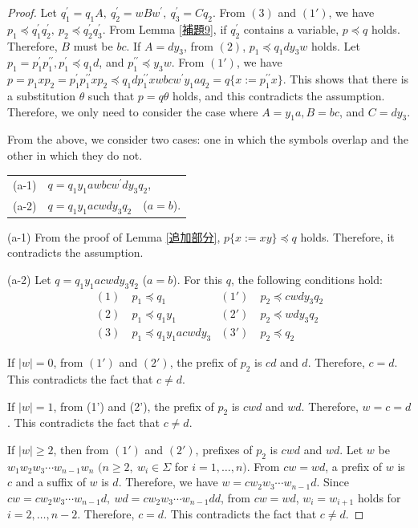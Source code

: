 \begin{proof}
Let $q^{\prime}_{1}=q_{1}A,~q^{\prime}_{2}=wBw^{\prime},~q^{\prime}_{3}=Cq_{2}$. From $(3)$ and $(1')$, we have $p_{1} \preceq q^{\prime}_{1}q^{\prime}_{2},~p_{2} \preceq q^{\prime}_{2}q^{\prime}_{3}$.
From Lemma \ref{補題9}, if $q^{\prime}_{2}$ contains a variable, $p \preceq q$ holds.
Therefore, $B$ must be $bc$.
If $A=dy_{3}$, from $(2)$, $p_{1} \preceq q_{1}dy_{3}w$ holds.
Let $p_{1}=p^{\prime}_{1}p^{\prime\prime}_{1}, p^{\prime}_{1} \preceq q_{1}d$, and $p^{\prime\prime}_{1} \preceq y_{3}w$.
From $(1')$, we have $p=p_{1}xp_{2}=p^{\prime}_{1}p^{\prime\prime}_{1}xp_{2} \preceq q_{1}dp^{\prime\prime}_{1}xwbcw^{\prime}y_{1}aq_{2}=q \{ x:=p^{\prime\prime}_{1}x \}$. This shows that there is a substitution $\theta$ such that $p=q\theta$ holds, and this contradicts the assumption. Therefore, we only need to consider the case where $A=y_{1}a,B=bc$, and $C=dy_{3}$.

From the above, we consider two cases: one in which the symbols overlap and the other in which they do not.
\smallskip

\begin{tabular}{cl}
\textrm{(a-1)} & $q=q_{1}y_{1}awbcw^{\prime}dy_{3}q_{2}$,\\
\textrm{(a-2)} & $q=q_{1}y_{1}acwdy_{3}q_{2}$~~($a=b$).
\end{tabular}
\smallskip

\textrm{(a-1)}
From the proof of Lemma \ref{追加部分}, $p \{ x:= xy \} \preceq q$ holds.
Therefore, it contradicts the assumption.

\textrm{(a-2)}
Let $q=q_{1}y_{1}acwdy_{3}q_{2}$ ($a=b$).
For this $q$, the following conditions hold:
\begin{align*}
(1)~& p_{1} \preceq q_{1} & (1')~& p_{2} \preceq cwdy_{3}q_{2} \\
(2)~& p_{1} \preceq q_{1}y_{1} & (2')~& p_{2} \preceq wdy_{3}q_{2} \\
(3)~& p_{1} \preceq q_{1}y_{1}acwdy_{3} & (3')~& p_{2} \preceq q_{2}
\end{align*}

%
If $|w|=0$, from $(1')$ and $(2')$, the prefix of $p_{2}$ is $cd$ and $d$.
Therefore, $c=d$. This contradicts the fact that $c \not = d$.

If $|w|=1$, from (1') and (2'), the prefix of $p_{2}$ is $cwd$ and $wd$.
Therefore, $w=c=d$.
This contradicts the fact that $c \not = d$.

If $|w| \ge 2$, then from $(1')$ and $(2')$,  prefixes of $p_{2}$ is $cwd$ and $wd$.
Let $w$ be $w_{1}w_{2}w_{3} \cdots w_{n-1}w_{n}$ $(n\geq 2,~w_{i}\in\Sigma$ for $i=1, \ldots , n)$.
From $cw=wd$, a prefix of $w$ is $c$ and a suffix of $w$ is $d$.
Therefore, we have $w=cw_{2}w_{3} \cdots w_{n-1}d$.
Since $cw=cw_{2}w_{3} \cdots w_{n-1}d,~wd=cw_{2}w_{3} \cdots w_{n-1}dd$, from $cw=wd$, $w_{i}=w_{i+1}$ holds for $i=2, \ldots , n-2$.
Therefore, $c=d$. This contradicts the fact that $c \not = d$.


\end{proof}
